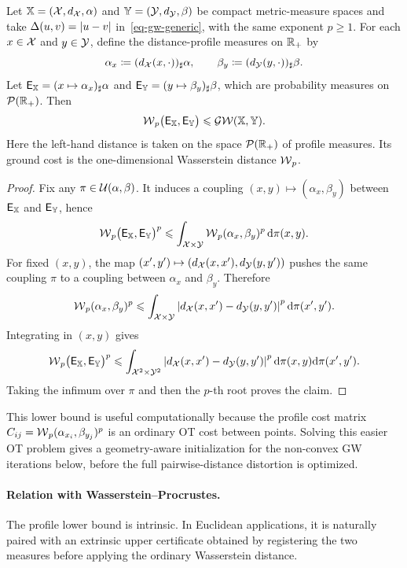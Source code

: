 \begin{prop}\label{prop-memoli-gw-profile-lower-bound}
	Let $\mathbb{X}=(\mathcal{X},d_{\mathcal{X}},\alpha)$ and $\mathbb{Y}=(\mathcal{Y},d_{\mathcal{Y}},\beta)$ be compact metric-measure spaces and take $\Delta(u,v)=|u-v|$ in~\eqref{eq-gw-generic}, with the same exponent $p\geq1$. For each $x\in\mathcal{X}$ and $y\in\mathcal{Y}$, define the distance-profile measures on $\mathbb{R}_+$ by
	\[
		\alpha_x\coloneqq(d_{\mathcal{X}}(x,\cdot))_\sharp\alpha,
		\qquad
		\beta_y\coloneqq(d_{\mathcal{Y}}(y,\cdot))_\sharp\beta.
	\]
	Let $\mathsf E_{\mathbb{X}}=(x\mapsto\alpha_x)_\sharp\alpha$ and $\mathsf E_{\mathbb{Y}}=(y\mapsto\beta_y)_\sharp\beta$, which are probability measures on $\mathcal{P}(\mathbb{R}_+)$. Then
	\[
		\operatorname{\mathcal{W}}_p\bigl(\mathsf E_{\mathbb{X}},\mathsf E_{\mathbb{Y}}\bigr)
		\leqslant
		\operatorname{\mathcal{GW}}(\mathbb{X},\mathbb{Y}).
	\]
	Here the left-hand distance is taken on the space $\mathcal{P}(\mathbb{R}_+)$ of profile measures.
	Its ground cost is the one-dimensional Wasserstein distance $\operatorname{\mathcal{W}}_p$.
\end{prop}
\begin{proof}
	Fix any $\pi\in\mathcal{U}(\alpha,\beta)$. It induces a coupling $(x,y)\mapsto(\alpha_x,\beta_y)$ between $\mathsf E_{\mathbb{X}}$ and $\mathsf E_{\mathbb{Y}}$, hence
	\[
		\operatorname{\mathcal{W}}_p\bigl(\mathsf E_{\mathbb{X}},\mathsf E_{\mathbb{Y}}\bigr)^p
		\leqslant
		\int_{\mathcal{X}\times\mathcal{Y}}\operatorname{\mathcal{W}}_p(\alpha_x,\beta_y)^p\,\mathrm{d}\pi(x,y).
	\]
	For fixed $(x,y)$, the map $(x',y')\mapsto(d_{\mathcal{X}}(x,x'),d_{\mathcal{Y}}(y,y'))$ pushes the same coupling $\pi$ to a coupling between $\alpha_x$ and $\beta_y$. Therefore
	\[
		\operatorname{\mathcal{W}}_p(\alpha_x,\beta_y)^p
		\leqslant
		\int_{\mathcal{X}\times\mathcal{Y}}
		\left\lvert d_{\mathcal{X}}(x,x')-d_{\mathcal{Y}}(y,y')\right\rvert^p
		\mathrm{d}\pi(x',y').
	\]
	Integrating in $(x,y)$ gives
	\[
		\operatorname{\mathcal{W}}_p\bigl(\mathsf E_{\mathbb{X}},\mathsf E_{\mathbb{Y}}\bigr)^p
		\leqslant
		\int_{\mathcal{X}^2\times\mathcal{Y}^2}
		\left\lvert d_{\mathcal{X}}(x,x')-d_{\mathcal{Y}}(y,y')\right\rvert^p
		\mathrm{d}\pi(x,y)\mathrm{d}\pi(x',y').
	\]
	Taking the infimum over $\pi$ and then the $p$-th root proves the claim.
\end{proof}

This lower bound is useful computationally because the profile cost matrix $C_{ij}=\operatorname{\mathcal{W}}_p(\alpha_{x_i},\beta_{y_j})^p$ is an ordinary OT cost between points. Solving this easier OT problem gives a geometry-aware initialization for the non-convex GW iterations below, before the full pairwise-distance distortion is optimized.

\paragraph{Relation with Wasserstein--Procrustes.}
The profile lower bound is intrinsic. In Euclidean applications, it is naturally paired with an extrinsic upper certificate obtained by registering the two measures before applying the ordinary Wasserstein distance.

